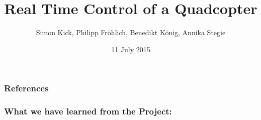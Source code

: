 \documentclass[12pt]{beamer} %
\title{Real Time Control of a Quadcopter}
\author{Simon Kick, Philipp Fr\"ohlich, Benedikt K\"onig, Annika Stegie}
\institute{Technische Universit\"at M\"unchen}
\date{11 July 2015}
\begin{document}
\begin{frame}
\maketitle
\thispagestyle{empty}
\end{frame}



%
%
%
%
%
%
%
%
%

\nocite{Boyd2009}
\nocite{Diehl2001}
\nocite{Diehl2002}
\nocite{Diehl2005}
\nocite{Diebel2006}
\nocite{Garcia2013}
\nocite{Richter-Gebert2009}
\nocite{Reyes-Valeria2013}
\nocite{Hartmann2014}
%
\begin{frame}[allowframebreaks] %
 \frametitle{References}
	
	
\end{frame}

\begin{frame}
	\frametitle{What we have learned from the Project:}
\end{frame}
\end{document}
